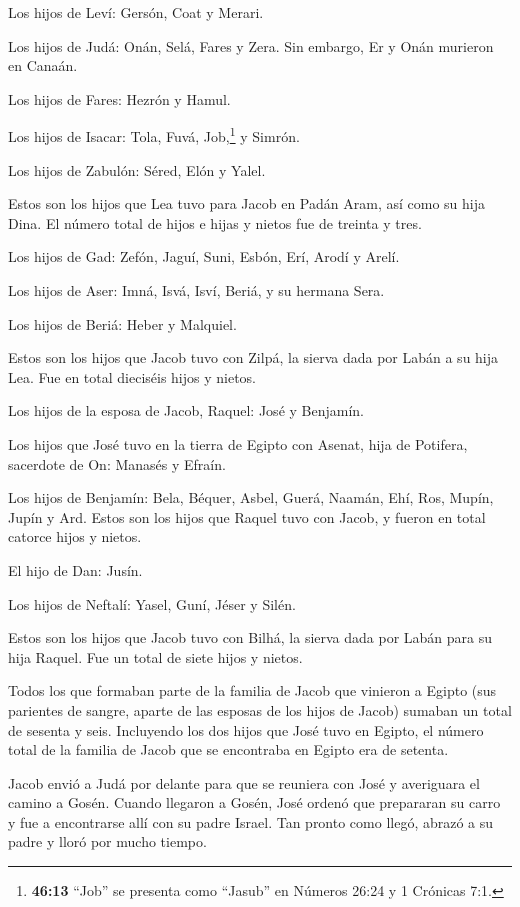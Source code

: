  Los hijos de Leví: Gersón, Coat y Merari.

 Los hijos de Judá: Onán, Selá, Fares y Zera. Sin embargo,
Er y Onán murieron en Canaán.

Los hijos de Fares: Hezrón y Hamul.

 Los hijos de Isacar: Tola, Fuvá, Job,\footnote{\textbf{46:13}
  ``Job'' se presenta como ``Jasub'' en Números 26:24 y 1 Crónicas 7:1.}
y Simrón.

 Los hijos de Zabulón: Séred, Elón y Yalel.

 Estos son los hijos que Lea tuvo para Jacob en Padán Aram,
así como su hija Dina. El número total de hijos e hijas y nietos fue de
treinta y tres.

 Los hijos de Gad: Zefón, Jaguí, Suni, Esbón, Erí, Arodí y
Arelí.

 Los hijos de Aser: Imná, Isvá, Isví, Beriá, y su hermana
Sera.

Los hijos de Beriá: Heber y Malquiel.

 Estos son los hijos que Jacob tuvo con Zilpá, la sierva
dada por Labán a su hija Lea. Fue en total dieciséis hijos y nietos.

 Los hijos de la esposa de Jacob, Raquel: José y Benjamín.

 Los hijos que José tuvo en la tierra de Egipto con Asenat,
hija de Potifera, sacerdote de On: Manasés y Efraín.

 Los hijos de Benjamín: Bela, Béquer, Asbel, Guerá, Naamán,
Ehí, Ros, Mupín, Jupín y Ard.  Estos son los hijos que
Raquel tuvo con Jacob, y fueron en total catorce hijos y nietos.

 El hijo de Dan: Jusín.

 Los hijos de Neftalí: Yasel, Guní, Jéser y Silén.

 Estos son los hijos que Jacob tuvo con Bilhá, la sierva
dada por Labán para su hija Raquel. Fue un total de siete hijos y
nietos.

 Todos los que formaban parte de la familia de Jacob que
vinieron a Egipto (sus parientes de sangre, aparte de las esposas de los
hijos de Jacob) sumaban un total de sesenta y seis. 
Incluyendo los dos hijos que José tuvo en Egipto, el número total de la
familia de Jacob que se encontraba en Egipto era de setenta.

 Jacob envió a Judá por delante para que se reuniera con
José y averiguara el camino a Gosén. Cuando llegaron a Gosén,
 José ordenó que prepararan su carro y fue a encontrarse
allí con su padre Israel. Tan pronto como llegó, abrazó a su padre y
lloró por mucho tiempo.

